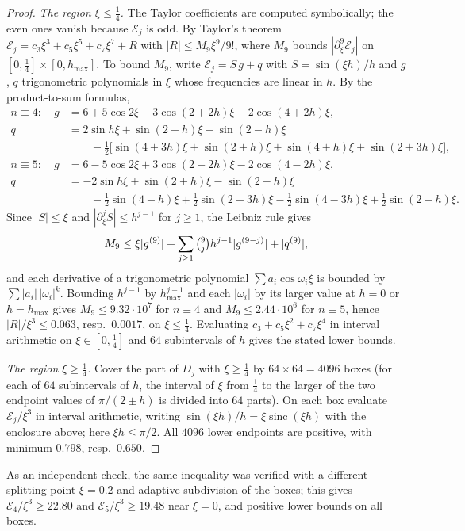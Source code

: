 \begin{proof}
\emph{The region $\xi\le\frac14$.} The Taylor coefficients are computed symbolically; the even ones vanish because
$\mathcal E_j$ is odd. By Taylor's theorem $\mathcal E_j=c_3\xi^3+c_5\xi^5+c_7\xi^7+R$ with $|R|\le M_9\xi^9/9!$, where $M_9$ bounds
$|\partial_\xi^9\mathcal E_j|$ on $[0,\frac14]\times[0,h_{\max}]$. To bound $M_9$, write $\mathcal E_j=S\,g+q$ with $S=\sin(\xi h)/h$ and $g$, $q$
trigonometric polynomials in $\xi$ whose frequencies are linear in $h$. By the product-to-sum formulas,
\begin{align*}
n\equiv4:\quad g&=6+5\cos2\xi-3\cos(2+2h)\xi-2\cos(4+2h)\xi,\\
q&=2\sin h\xi+\sin(2+h)\xi-\sin(2-h)\xi\\
&\qquad-\tfrac12\bigl[\sin(4+3h)\xi+\sin(2+h)\xi+\sin(4+h)\xi+\sin(2+3h)\xi\bigr],\\
n\equiv5:\quad g&=6-5\cos2\xi+3\cos(2-2h)\xi-2\cos(4-2h)\xi,\\
q&=-2\sin h\xi+\sin(2+h)\xi-\sin(2-h)\xi\\
&\qquad-\tfrac12\sin(4-h)\xi+\tfrac12\sin(2-3h)\xi-\tfrac12\sin(4-3h)\xi+\tfrac12\sin(2-h)\xi .
\end{align*}
Since $|S|\le\xi$ and $|\partial_\xi^jS|\le h^{j-1}$ for $j\ge1$, the Leibniz rule gives
\[
M_9\le\xi|g^{(9)}|+\sum_{j\ge1}\tbinom9j h^{j-1}|g^{(9-j)}|+|q^{(9)}|,
\]
and each derivative of a trigonometric polynomial
$\sum a_i\cos\omega_i\xi$ is bounded by $\sum|a_i|\,|\omega_i|^k$. Bounding $h^{j-1}$ by $h_{\max}^{j-1}$ and each $|\omega_i|$ by its larger
value at $h=0$ or $h=h_{\max}$ gives $M_9\le9.32\cdot10^7$ for $n\equiv4$ and $M_9\le2.44\cdot10^6$ for $n\equiv5$, hence
$|R|/\xi^3\le0.063$, resp.\ $0.0017$, on $\xi\le\frac14$. Evaluating $c_3+c_5\xi^2+c_7\xi^4$ in interval arithmetic on
$\xi\in[0,\frac14]$ and $64$ subintervals of $h$ gives the stated lower bounds.

\emph{The region $\xi\ge\frac14$.} Cover the part of $D_j$ with $\xi\ge\frac14$ by $64\times64=4096$ boxes (for each of $64$
subintervals of $h$, the interval of $\xi$ from $\frac14$ to the larger of the two endpoint values of $\pi/(2\pm h)$ is divided
into $64$ parts). On each box evaluate $\mathcal E_j/\xi^3$ in interval arithmetic, writing $\sin(\xi h)/h=\xi\operatorname{sinc}(\xi h)$
with the enclosure above; here $\xi h\le\pi/2$. All $4096$ lower endpoints are positive, with minimum $0.798$, resp.\
$0.650$.
\end{proof}

As an independent check, the same inequality was verified with a different splitting point $\xi=0.2$ and
adaptive subdivision of the boxes; this gives $\mathcal E_4/\xi^3\ge22.80$ and $\mathcal E_5/\xi^3\ge19.48$ near $\xi=0$, and positive lower
bounds on all boxes.

